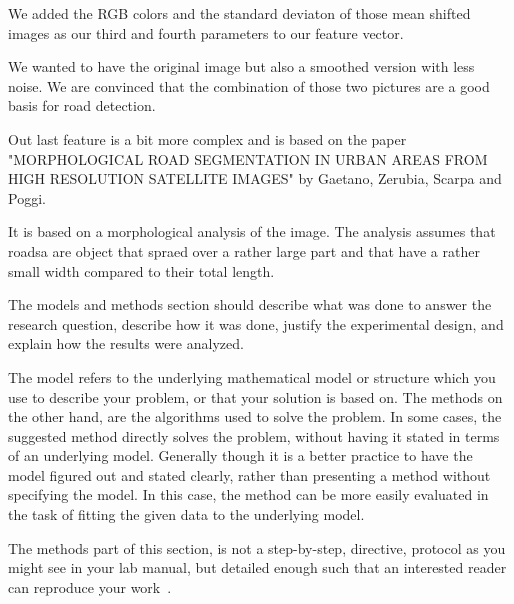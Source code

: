 \documentclass[10pt,conference,compsocconf]{IEEEtran}
\begin{document}
We added the RGB colors and the standard deviaton of those mean shifted images as our third and fourth parameters to our feature vector. 

We wanted to have the original image but also a smoothed version with less noise. We are convinced that the combination of those two pictures are a good basis for road detection.




Out last feature is a bit more complex and is based on the paper "MORPHOLOGICAL ROAD SEGMENTATION IN URBAN AREAS FROM HIGH RESOLUTION SATELLITE IMAGES" by Gaetano, Zerubia, Scarpa and Poggi.

It is based on a morphological analysis of the image. The analysis assumes that roadsa are object that spraed over a rather large part and that have a rather small width compared to their total length.






The models and methods
section should describe what was
done to answer the research question, describe how it was done,
justify the experimental design, and
explain how the results were analyzed.

The model refers to the underlying mathematical model or structure which 
you use to describe your problem, or that your solution is based on. 
The methods on the other hand, are the algorithms used to solve the problem. 
In some cases, the suggested method directly solves the problem, without having it 
stated in terms of an underlying model. Generally though it is a better practice to have 
the model figured out and stated clearly, rather than presenting a method without specifying 
the model. In this case, the method can be more easily evaluated in the task of fitting 
the given data to the underlying model.

The methods part of this section, is not a step-by-step, directive,
protocol as you might see in your lab manual, but detailed enough such
that an interested reader can reproduce your
work~\cite{anderson04,wavelab}.
\end{document}
